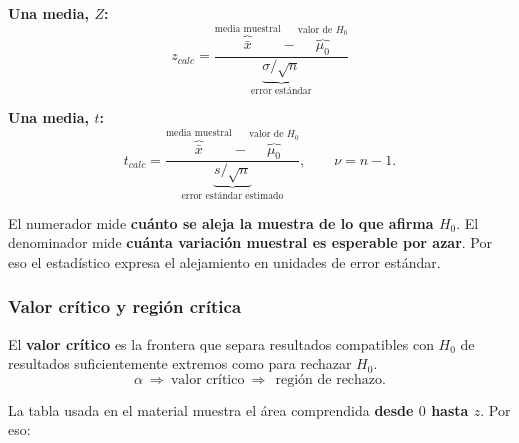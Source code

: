 \documentclass[11pt,a4paper]{article}
\begin{document}
\textbf{Una media, $Z$:}
\[
 z_{calc}=\frac{\overbrace{\bar{x}}^{\text{media muestral}}-\overbrace{\mu_0}^{\text{valor de }H_0}}
 {\underbrace{\sigma/\sqrt{n}}_{\text{error estándar}}}
\]

\textbf{Una media, $t$:}
\[
 t_{calc}=\frac{\overbrace{\bar{x}}^{\text{media muestral}}-\overbrace{\mu_0}^{\text{valor de }H_0}}
 {\underbrace{s/\sqrt{n}}_{\text{error estándar estimado}}},
 \qquad \nu=n-1.
\]

\begin{ideaclave}
El numerador mide \textbf{cuánto se aleja la muestra de lo que afirma $H_0$}. El denominador mide \textbf{cuánta variación muestral es esperable por azar}. Por eso el estadístico expresa el alejamiento en unidades de error estándar.
\end{ideaclave}

\subsubsection{Valor crítico y región crítica}

El \textbf{valor crítico} es la frontera que separa resultados compatibles con $H_0$ de resultados suficientemente extremos como para rechazar $H_0$.
\[
\boxed{\alpha}\ \Longrightarrow\ \boxed{\text{valor crítico}}\ \Longrightarrow\
\ \boxed{\text{región de rechazo}}.
\]

La tabla usada en el material muestra el área comprendida \textbf{desde $0$ hasta $z$}. Por eso:
\end{document}
